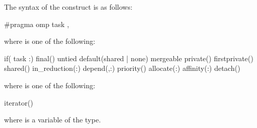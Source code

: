 \syntax
\begin{ccppspecific}
\begin{samepage}
The syntax of the  construct is as follows:

\begin{ompcPragma}
#pragma omp task \plc{[clause[ [},\plc{] clause] ... ] new-line}
\end{ompcPragma}
\end{samepage}

\begin{samepage}
where  is one of the following{}:

\begin{indentedcodelist}
if(\plc{[} task :\plc{] scalar-expression})
final()
untied
default(shared \textnormal{|} none)
mergeable
private()
firstprivate()
shared()
in_reduction(:)
depend(\plc{[depend-modifier},\plc{] dependence-type }:)
priority()
allocate(\plc{[allocator }:\plc{] list})
affinity(\plc{[aff-modifier }:\plc{] locator-list})
detach()
\end{indentedcodelist}

where  is one of the following{}:
\begin{indentedcodelist}
iterator() 
\end{indentedcodelist}

where  is a variable of the  type.

\end{samepage}
\end{ccppspecific}

